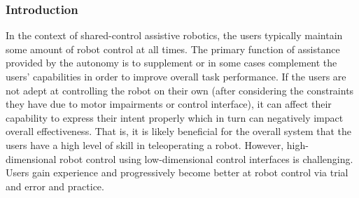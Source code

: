 \documentclass[12pt]{article}
\begin{document}
\subsubsection{Introduction}

In the context of shared-control assistive robotics, the users typically maintain some amount of robot control at all times. The primary function of assistance provided by the autonomy is to supplement or in some cases complement the users' capabilities in order to improve overall task performance. If the users are not adept at controlling the robot on their own (after considering the constraints they have due to motor impairments or control interface), it can affect their capability to express their intent properly which in turn can negatively impact overall effectiveness. That is, it is likely beneficial for the overall system that the users have a high level of skill in teleoperating a robot. 
However, high-dimensional robot control using low-dimensional control interfaces is challenging. Users gain experience and progressively become better at robot control via trial and error and practice. 


%
%
%

\end{document}
